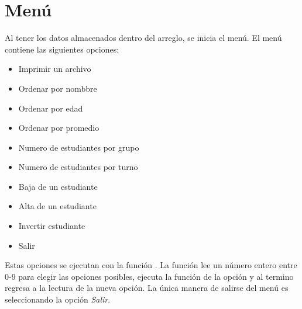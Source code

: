 \section{Menú}

Al tener los datos almacenados dentro del arreglo, se inicia el menú. El menú contiene las siguientes opciones:

\begin{itemize}
    \item Imprimir un archivo
    \item Ordenar por nombbre
    \item Ordenar por edad
    \item Ordenar por promedio
    \item Numero de estudiantes por grupo
    \item Numero de estudiantes por turno
    \item Baja de un estudiante
    \item Alta de un estudiante
    \item Invertir estudiante
    \item Salir
\end{itemize}

Estas opciones se ejecutan con la función . La función lee un número entero entre 0-9 para elegir las opciones posibles, ejecuta la función de la opción y al termino regresa a la lectura de la nueva opción. La única manera de salirse del menú es seleccionando la opción \textit{Salir}.

